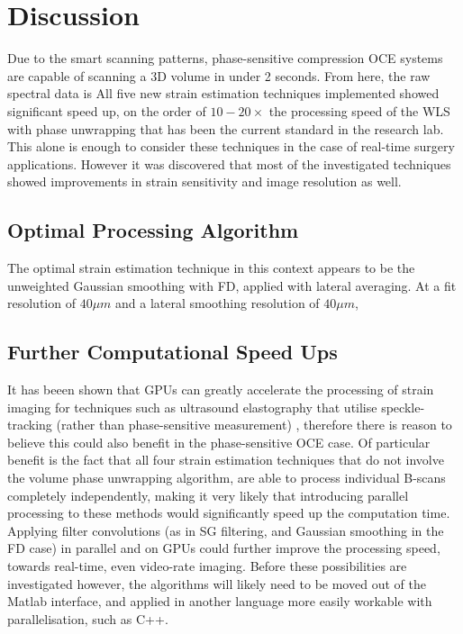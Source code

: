 \chapter{Discussion}

Due to the smart scanning patterns, phase-sensitive compression OCE systems are capable of scanning a 3D volume in under 2 seconds. From here, the raw spectral data is 
All five new strain estimation techniques implemented showed significant speed up, on the order of $10-20\times$ the processing speed of the WLS with phase unwrapping that has been the current standard in the research lab. This alone is enough to consider these techniques in the case of real-time surgery applications. However it was discovered that most of the investigated techniques showed improvements in strain sensitivity and image resolution as well.

\section{Optimal Processing Algorithm}

The optimal strain estimation technique in this context appears to be the unweighted Gaussian smoothing with FD, applied with lateral averaging. At a fit resolution of $40\mu m$ and a lateral smoothing resolution of $40\mu m$, 

\section{Further Computational Speed Ups}

It has beeen shown that GPUs can greatly accelerate the processing of strain imaging for techniques such as ultrasound elastography that utilise speckle-tracking (rather than phase-sensitive measurement) \cite{peng_gpu-accelerated_2017}, therefore there is reason to believe this could also benefit in the phase-sensitive OCE case. Of particular benefit is the fact that all four strain estimation techniques that do not involve the volume phase unwrapping algorithm, are able to process individual B-scans completely independently, making it very likely that introducing parallel processing to these methods would significantly speed up the computation time. Applying filter convolutions (as in SG filtering, and Gaussian smoothing in the FD case) in parallel and on GPUs could further improve the processing speed, towards real-time, even video-rate imaging.
Before these possibilities are investigated however, the algorithms will likely need to be moved out of the Matlab interface, and applied in another language more easily workable with parallelisation, such as C++.

